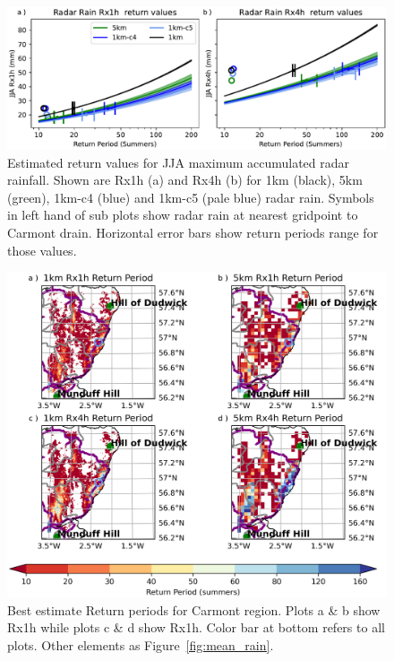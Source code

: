 \documentclass[11pt,a4paper]{article}
\begin{document}
\begin{figure}
	\centering
	\includegraphics[width=\linewidth]{radar_return_prds}
	\caption{Estimated return values for  JJA maximum accumulated radar rainfall. Shown are Rx1h (a) and Rx4h (b) for 1km  (black),  5km (green), 1km-c4 (blue) and 1km-c5 (pale blue) radar rain. Symbols in left hand of sub plots show radar rain at nearest gridpoint to Carmont drain. Horizontal error bars show return periods range for those values. }
	\label{fig:radar_rtn_prd}
\end{figure}

\begin{figure}
	\centering
	\includegraphics[width=\linewidth]{map_return_prds}
	\caption{Best estimate Return periods for Carmont region. Plots a \& b show Rx1h while plots c \& d show Rx1h. Color bar at bottom refers to all plots. Other elements as Figure~\ref{fig:mean_rain}. } 
	\label{fig:map_rtn_prd}
\end{figure}
\end{document}
